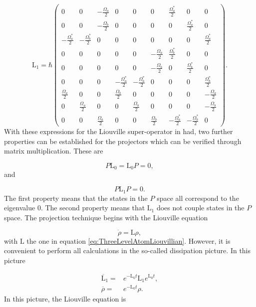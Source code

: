 \documentclass[12pt]{article}
\begin{document}
\begin{equation}
    \mathrm{L}_1 = \hbar\begin{pmatrix}0 & 0 & -\frac{ \Omega_a}{2} & 0 & 0 & 0 & \frac{ \Omega_a^*}{2} & 0 & 0\\
0 & 0 & -\frac{ \Omega_b}{2} & 0 & 0 & 0 & 0 & \frac{ \Omega_a^*}{2} & 0\\
-\frac{ \Omega_a^*}{2} & -\frac{ \Omega_b^*}{2} & 0 & 0 & 0 & 0 & 0 & 0 & \frac{ \Omega_a^*}{2}\\
0 & 0 & 0 & 0 & 0 & -\frac{ \Omega_a}{2} & \frac{ \Omega_b^*}{2} & 0 & 0\\
0 & 0 & 0 & 0 & 0 & -\frac{ \Omega_b}{2} & 0 & \frac{ \Omega_b^*}{2} & 0\\
0 & 0 & 0 & -\frac{ \Omega_a^*}{2} & -\frac{ \Omega_b^*}{2} & 0 & 0 & 0 & \frac{ \Omega_b^*}{2}\\
\frac{ \Omega_a}{2} & 0 & 0 & \frac{ \Omega_b}{2} & 0 & 0 & 0 & 0 & -\frac{ \Omega_a}{2}\\
0 & \frac{ \Omega_a}{2} & 0 & 0 & \frac{ \Omega_b}{2} & 0 & 0 & 0 & -\frac{ \Omega_b}{2}\\
0 & 0 & \frac{ \Omega_a}{2} & 0 & 0 & \frac{ \Omega_b}{2} & -\frac{ \Omega_a^*}{2} & -\frac{ \Omega_b^*}{2} & 0\end{pmatrix}.
\end{equation} With these expressions for the Liouville super-operator in had, two further properties can be established for the projectors which can be verified through matrix multiplication. These are

\begin{equation}
    P\mathrm{L}_0 = \mathrm{L}_0P = 0,
\end{equation} and

\begin{equation}
    P\mathrm{L}_1P = 0.
\end{equation} The first property means that the states in the $P$  space all correspond to the eigenvalue 0. The second property means that $\mathrm{L}_1$ does not couple states in the $P$ space. The projection technique begins with the Liouville equation

\begin{equation}
    \dot{\rho} = \mathrm{L}\rho,
\end{equation} with $\mathrm{L}$ the one in equation \eqref{eq:ThreeLevelAtomLiouvillian}. However, it is convenient to perform all calculations in the so-called dissipation picture. In this picture

\begin{align}
    \overline{\mathrm{L}}_1 =& e^{-\mathrm{L}_0 t}\mathrm{L}_1e^{\mathrm{L}_0 t},\\
    \overline{\rho}=&e^{-\mathrm{L}_0 t}\rho.
\end{align} In this picture, the Liouville equation is
\end{document}
